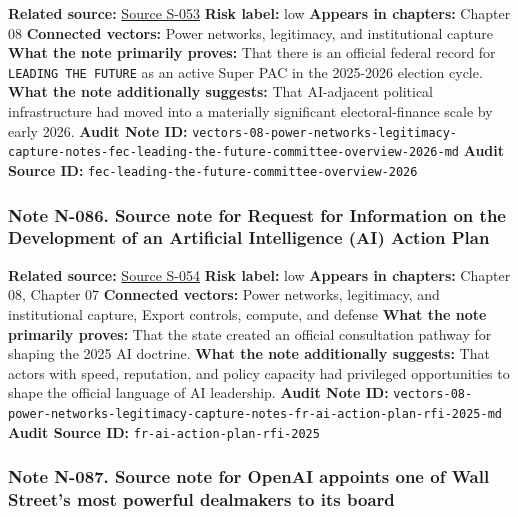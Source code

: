 \documentclass[
  american,
  11pt,
  letterpaper,
]{article}
\begin{document}
\textbf{Related source:}
\hyperref[source-s-053-leading-the-future-committee-overview]{Source
S-053} \textbf{Risk label:} low \textbf{Appears in chapters:} Chapter 08
\textbf{Connected vectors:} Power networks, legitimacy, and
institutional capture \textbf{What the note primarily proves:} That
there is an official federal record for \texttt{LEADING\ THE\ FUTURE} as
an active Super PAC in the 2025-2026 election cycle. \textbf{What the
note additionally suggests:} That AI-adjacent political infrastructure
had moved into a materially significant electoral-finance scale by early
2026. \textbf{Audit Note ID:}
\texttt{vectors-08-power-networks-legitimacy-capture-notes-fec-leading-the-future-committee-overview-2026-md}
\textbf{Audit Source ID:}
\texttt{fec-leading-the-future-committee-overview-2026}

\subsubsection{Note N-086. Source note for Request for Information on
the Development of an Artificial Intelligence (AI) Action
Plan}\label{note-n-086-vectors-08-power-networks-legitimacy-capture-notes-fr-ai-action-plan-rfi-2025-md}

\textbf{Related source:}
\hyperref[source-s-054-request-for-information-on-the-development-of-an-artificial-intelligence-ai-action-plan]{Source
S-054} \textbf{Risk label:} low \textbf{Appears in chapters:} Chapter
08, Chapter 07 \textbf{Connected vectors:} Power networks, legitimacy,
and institutional capture, Export controls, compute, and defense
\textbf{What the note primarily proves:} That the state created an
official consultation pathway for shaping the 2025 AI doctrine.
\textbf{What the note additionally suggests:} That actors with speed,
reputation, and policy capacity had privileged opportunities to shape
the official language of AI leadership. \textbf{Audit Note ID:}
\texttt{vectors-08-power-networks-legitimacy-capture-notes-fr-ai-action-plan-rfi-2025-md}
\textbf{Audit Source ID:} \texttt{fr-ai-action-plan-rfi-2025}

\subsubsection{Note N-087. Source note for OpenAI appoints one of Wall
Street's most powerful dealmakers to its
board}\label{note-n-087-vectors-08-power-networks-legitimacy-capture-notes-ft-openai-ogunlesi-board-2025-md}
\end{document}
